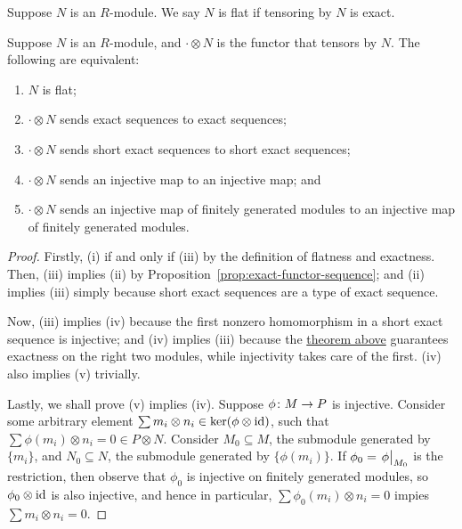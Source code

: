 \begin{definition}
    Suppose \(N\) is an \(R\)-module.
    We say \(N\) is flat if tensoring by \(N\) is exact.
\end{definition}
\begin{lemma}\label{lem:flat-equivalence}
    Suppose \(N\) is an \(R\)-module,
    and \(\cdot\otimes N\) is the functor that tensors by \(N\).
    The following are equivalent:
    \begin{enumerate}[label={(\roman*)}, itemsep=0mm]
        \item \(N\) is flat;
        \item \(\cdot\otimes N\) sends exact sequences to exact sequences;
        \item \(\cdot\otimes N\) sends short exact sequences to short exact sequences;
        \item \(\cdot\otimes N\) sends an injective map to an injective map; and
        \item \(\cdot\otimes N\) sends an injective map of finitely generated modules
            to an injective map of finitely generated modules.
    \end{enumerate}
\end{lemma}
\begin{proof}
    Firstly, (i) if and only if (iii) by the definition of flatness and exactness.
    Then, (iii) implies (ii) by Proposition~\ref{prop:exact-functor-sequence};
    and (ii) implies (iii) simply because short exact sequences are a type of exact sequence.

    Now, (iii) implies (iv) because the first nonzero homomorphism in a short exact sequence is injective;
    and (iv) implies (iii) because the \hyperref[thm:tensor-right-exact]{theorem above}
    guarantees exactness on the right two modules,
    while injectivity takes care of the first.
    (iv) also implies (v) trivially.

    Lastly, we shall prove (v) implies (iv).
    Suppose \(\phi\colon M\to P\) is injective.
    Consider some arbitrary element \(\sum m_i \otimes n_i \in \ker(\phi\otimes\operatorname{id})\),
    such that \(\sum \phi(m_i) \otimes n_i = 0 \in P \otimes N\).
    Consider \(M_0 \subseteq M\), the submodule generated by \(\{m_i\}\),
    and \(N_0 \subseteq N\), the submodule generated by \(\{\phi(m_i)\}\).
    If \(\phi_0 = \eval{\phi}_{M_0}\) is the restriction,
    then observe that \(\phi_0\) is injective on finitely generated modules,
    so \(\phi_0\otimes\operatorname{id}\) is also injective,
    and hence in particular, \(\sum \phi_0(m_i) \otimes n_i = 0\)
    impies \(\sum m_i \otimes n_i = 0\).
\end{proof}

